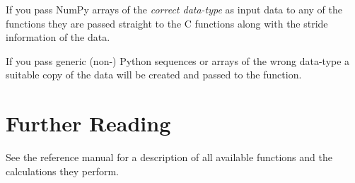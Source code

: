 If you pass NumPy arrays of the \emph{correct data-type} as input data
to any of the functions they are passed straight to the C functions
along with the stride information of the data.

If you pass generic (non-\numpy{}) Python sequences or \numpy{} arrays of the
wrong data-type a suitable copy of the data will be created and passed to the
function.


\section{Further Reading}
\label{sec:stat-further-reading}

See the \gsl{} reference manual for a description of all available functions
and the calculations they perform.


